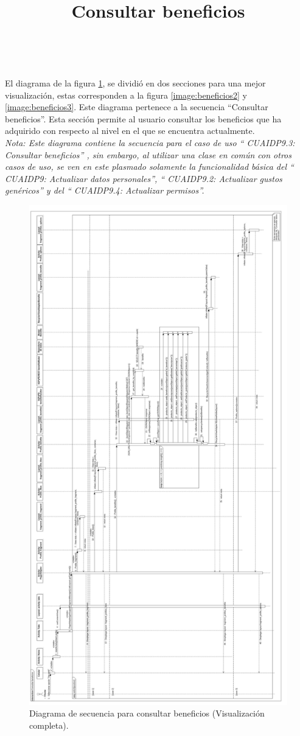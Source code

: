 \title{\textbf{Consultar beneficios}}
\\ \par
El diagrama de la figura \ref{image:beneficios}, se dividió en dos secciones para una mejor visualización, estas corresponden a la figura \ref{image:beneficios2} y \ref{image:beneficios3}. Este diagrama pertenece a la secuencia ``Consultar beneficios''. Esta sección permite al usuario consultar los beneficios que ha adquirido con respecto al nivel en el que se encuentra actualmente.\\
\textit{Nota: Este diagrama contiene la secuencia para el caso de uso `` CUAIDP9.3: Consultar beneficios'' , sin embargo, al utilizar una clase en común con otros casos de uso, se ven en este plasmado solamente la funcionalidad básica del `` CUAIDP9: Actualizar datos personales'',  `` CUAIDP9.2: Actualizar gustos genéricos'' y del `` CUAIDP9.4: Actualizar permisos''.}
\FloatBarrier
\begin{figure}[htbp!]
		\centering
			\includegraphics[width=.5 \textwidth]{imagenes/Diagramas_UserApp/Nuevos_diagramas/Horizontal/beneficios}
		\caption{Diagrama de secuencia para consultar beneficios (Visualización completa).}
		\label{image:beneficios}
\end{figure}
\FloatBarrier

